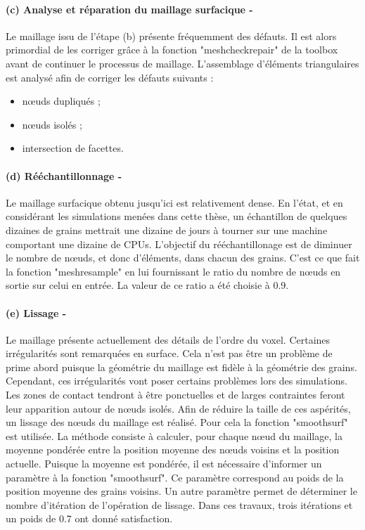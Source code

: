 \paragraph{(c) Analyse et réparation du maillage surfacique -}
Le maillage issu de l'étape (b) présente fréquemment des défauts. Il est alors primordial de les corriger grâce à la fonction "meshcheckrepair" de la toolbox avant de continuer le processus de maillage. L'assemblage d'éléments triangulaires est analysé afin de corriger les défauts suivants :
\begin{itemize}
	\item n\oe{}uds dupliqués ;
	\item n\oe{}uds isolés ;
	\item intersection de facettes.
\end{itemize}
\paragraph{(d) Rééchantillonnage -}
Le maillage surfacique obtenu jusqu'ici est relativement dense. En l'état, et en considérant les simulations menées dans cette thèse, un échantillon de quelques dizaines de grains mettrait une dizaine de jours à tourner sur une machine comportant une dizaine de CPUs. L'objectif du rééchantillonage est de diminuer le nombre de n\oe{}uds, et donc d'éléments, dans chacun des grains. C'est ce que fait la fonction "meshresample" en lui fournissant le ratio du nombre de n\oe{}uds en sortie sur celui en entrée. La valeur de ce ratio a été choisie à \num{0.9}.
\paragraph{(e) Lissage -}
Le maillage présente actuellement des détails de l'ordre du voxel. Certaines irrégularités sont remarquées en surface. Cela n'est pas être un problème de prime abord puisque la géométrie du maillage est fidèle à la géométrie des grains. Cependant, ces irrégularités vont poser certains problèmes lors des simulations. Les zones de contact tendront à être ponctuelles et de larges contraintes feront leur apparition autour de n\oe{}uds isolés. Afin de réduire la taille de ces aspérités, un lissage des n\oe{}uds du maillage est réalisé. Pour cela la fonction "smoothsurf" est utilisée. La méthode consiste à calculer, pour chaque n\oe{}ud du maillage, la moyenne pondérée entre la position moyenne des n\oe{}uds voisins et la position actuelle. Puisque la moyenne est pondérée, il est nécessaire d'informer un paramètre à la fonction "smoothsurf". Ce paramètre correspond au poids de la position moyenne des grains voisins. Un autre paramètre permet de déterminer le nombre d'itération de l'opération de lissage. Dans ces travaux, trois itérations et un poids de \num{0.7} ont donné satisfaction.
